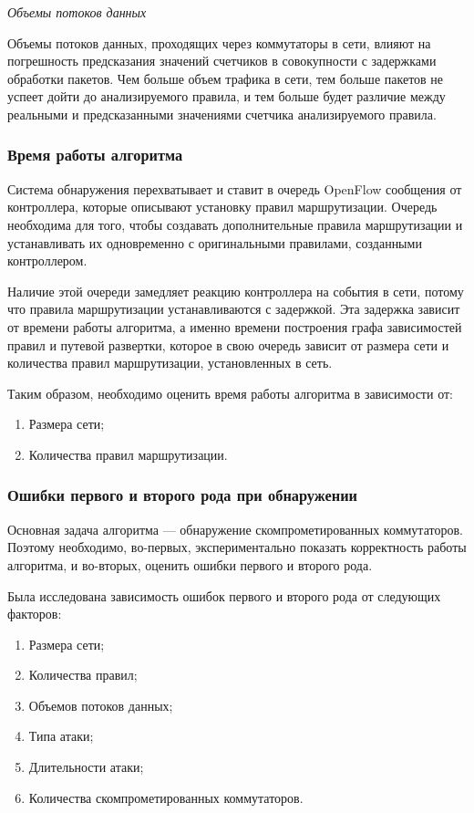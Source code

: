\documentclass[../thesis.tex]{subfiles}
\begin{document}
\textit{Объемы потоков данных}

Объемы потоков данных, проходящих через коммутаторы в сети, влияют на погрешность предсказания значений счетчиков в совокупности с задержками обработки пакетов.
Чем больше объем трафика в сети, тем больше пакетов не успеет дойти до анализируемого правила, и тем больше будет различие между реальными и предсказанными значениями счетчика анализируемого правила.

\subsubsection{Время работы алгоритма}

Система обнаружения перехватывает и ставит в очередь OpenFlow сообщения от контроллера, которые описывают установку правил маршрутизации.
Очередь необходима для того, чтобы создавать дополнительные правила маршрутизации и устанавливать их одновременно с оригинальными правилами, созданными контроллером.

Наличие этой очереди замедляет реакцию контроллера на события в сети, потому что правила маршрутизации устанавливаются с задержкой.
Эта задержка зависит от времени работы алгоритма, а именно времени построения графа зависимостей правил и путевой развертки, которое в свою очередь зависит от размера сети и количества правил маршрутизации, установленных в сеть.

Таким образом, необходимо оценить время работы алгоритма в зависимости от:
\begin{enumerate}
\item Размера сети;
\item Количества правил маршрутизации.
\end{enumerate}

\subsubsection{Ошибки первого и второго рода при обнаружении}

Основная задача алгоритма --- обнаружение скомпрометированных коммутаторов.
Поэтому необходимо, во-первых, экспериментально показать корректность работы алгоритма, и во-вторых, оценить ошибки первого и второго рода.

Была исследована зависимость ошибок первого и второго рода от следующих факторов:
\begin{enumerate}
\item Размера сети;
\item Количества правил;
\item Объемов потоков данных;
\item Типа атаки;
\item Длительности атаки;
\item Количества скомпрометированных коммутаторов.
\end{enumerate}
\end{document}
